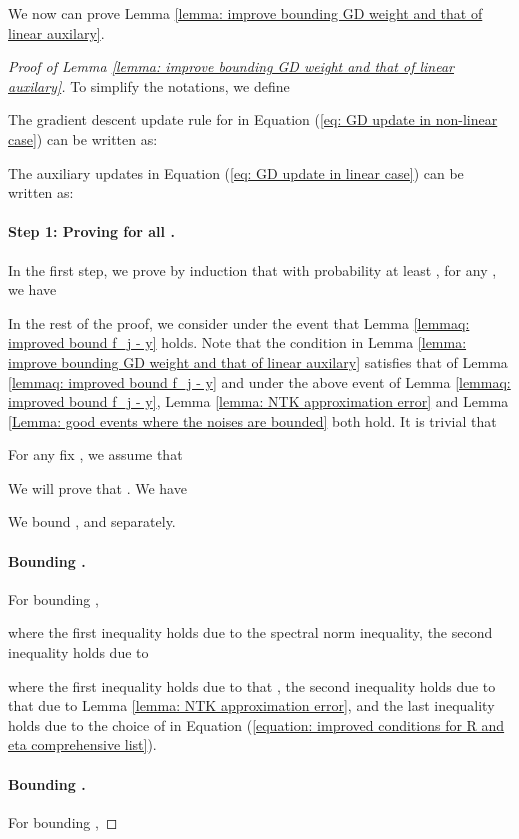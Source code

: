 \documentclass{article} \usepackage{iclr2023/iclr2023_conference,times}
\begin{document}
We now can prove Lemma \ref{lemma: improve bounding GD weight and that of linear auxilary}. 
\begin{proof}[Proof of Lemma \ref{lemma: improve bounding GD weight and that of linear auxilary}]
To simplify the notations, we define 

The gradient descent update rule for  in Equation (\ref{eq: GD update in non-linear case}) can be written as: 


The auxiliary updates in Equation (\ref{eq: GD update in linear case}) can be written as:


\paragraph{Step 1: Proving  for all .} In the first step, we prove by induction that with probability at least , for any , we have 


In the rest of the proof, we consider under the event that Lemma \ref{lemmaq: improved bound f_j - y} holds. Note that the condition in Lemma \ref{lemma: improve bounding GD weight and that of linear auxilary} satisfies that of Lemma \ref{lemmaq: improved bound f_j - y} and under the above event of Lemma \ref{lemmaq: improved bound f_j - y}, Lemma \ref{lemma: NTK approximation error} and Lemma \ref{Lemma: good events where the noises are bounded} both hold. It is trivial that 

For any fix , we assume that


We will prove that . We have

We bound ,  and  separately. 




\paragraph{Bounding .} For bounding ,

where the first inequality holds due to the spectral norm inequality, the second inequality holds due to 

where the first inequality holds due to that , the second inequality holds due to that  due to Lemma \ref{lemma: NTK approximation error}, and the last inequality holds due to the choice of  in Equation (\ref{equation: improved conditions for R and eta comprehensive list}). 

\paragraph{Bounding .} For bounding ,


\end{proof}
\end{document}
